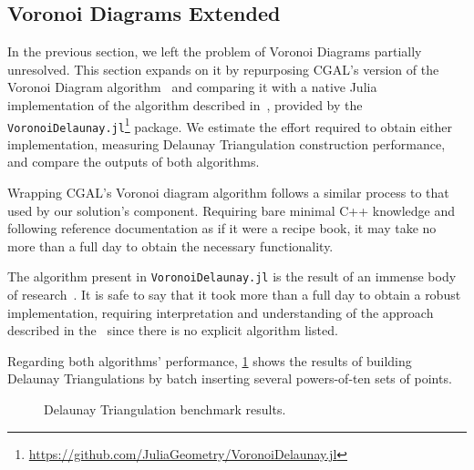 \subsection{Voronoi Diagrams Extended}%
\label{sec:eval.voronoi}

In the previous section, we left the problem of Voronoi Diagrams partially
unresolved.  This section expands on it by repurposing \ac{CGAL}'s version of
the Voronoi Diagram algorithm~\cite{CGAL:5.3:VDA2} and comparing it with a
native Julia implementation of the algorithm described
in~\cite{Springel:2010:GCHSMM}, provided by the
\texttt{VoronoiDelaunay.jl}\footnote{\url{https://github.com/JuliaGeometry/VoronoiDelaunay.jl}}
package.  We estimate the effort required to obtain either implementation,
measuring Delaunay Triangulation construction performance, and compare the
outputs of both algorithms.

Wrapping \ac{CGAL}'s Voronoi diagram algorithm follows a similar process to that
used by our solution's \wrapper{} component.  Requiring bare minimal C++
knowledge and following reference documentation as if it were a recipe book, it
may take no more than a full day to obtain the necessary functionality.

The algorithm present in \texttt{VoronoiDelaunay.jl} is the result of an immense
body of research~\cite{Springel:2010:GCHSMM}.  It is safe to say that it took
more than a full day to obtain a robust implementation, requiring interpretation
and understanding of the approach described in the~\cite{Springel:2010:GCHSMM}
since there is no explicit algorithm listed.

Regarding both algorithms' performance, \cref{fig:eval.voronoi.bench} shows
the results of building Delaunay Triangulations by batch inserting several
powers-of-ten sets of points.

\begin{figure}[htb]
  \centering
  \caption{\label{fig:eval.voronoi.bench}
    Delaunay Triangulation benchmark results.}%
\end{figure}

